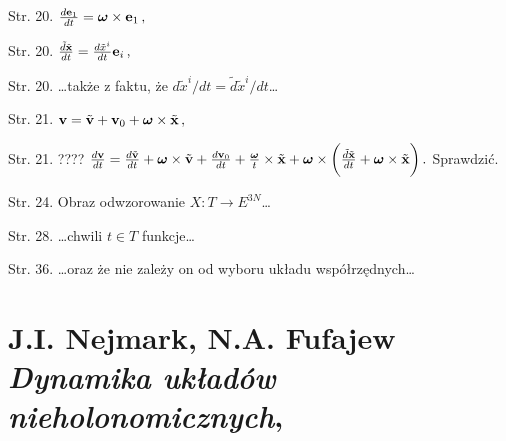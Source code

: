 \documentclass[a4paper,11pt]{article}
\numberwithin{equation}{section}
\begin{document}
Str. 20.
$\frac{ d\mathbf{e}_{ 1 } }{ dt } = \boldsymbol{\omega} \times \mathbf{e}_{ 1 } \, ,$

Str. 20.
$\frac{ \tilde{ d } \tilde{ \mathbf{x} } }{ d t }
= \frac{ d\tilde{ x }^{ i } }{ dt } \mathbf{e}_{ i } \, ,$

Str. 20. \ldots także z faktu, że
$d \tilde{ x }^{ i } / d t = \tilde{ d } \tilde{ x
}^{ i } / d t$\ldots

Str. 21.
$\mathbf{v} = \tilde{ \mathbf{v} } + \mathbf{v}_{ 0 } +
\boldsymbol{\omega} \times \tilde{ \mathbf{x} } \, ,$

Str. 21. ????
$\frac{ d\mathbf{v} }{ dt } = \frac{ d\tilde{ \mathbf{v} } }{ dt }
+ \boldsymbol{\omega} \times \tilde{ \mathbf{v} } + \frac{
  d\mathbf{v}_{ 0 } }{ dt } + \frac{ \boldsymbol{\omega} }{ t }
\times \tilde{ \mathbf{x} } + \boldsymbol{\omega}  \times \bigg(
\frac{ \tilde{ d } \tilde{ \mathbf{x} } }{ d t } +
\boldsymbol{\omega} \times \tilde{ \mathbf{x} } \bigg) \, .$
Sprawdzić.

Str. 24. Obraz odwzorowanie
$X : T \rightarrow E^{ 3N }$\ldots

Str. 28. \ldots chwili $t \in T$ funkcje\ldots

Str. 36. \ldots oraz że nie zależy on od wyboru układu
współrzędnych\ldots


\VerSpaceTwo










\newpage

\section{ %
  J.I. Nejmark, N.A. Fufajew \\
  \textit{Dynamika układów nieholonomicznych},
  \cite{NejmarkFufajewDynamikaUkladowNieholonomicznych1971}}



\end{document}
